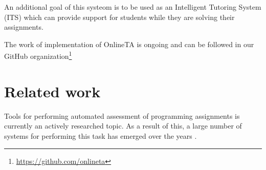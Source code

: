 An additional goal of this systeom is to be used as an Intelligent
Tutoring System (ITS)\cite{Freedman:2000:LIT:350752.350756} which can
provide support for students while they are solving their assignments.

The work of implementation of OnlineTA is ongoing and can be followed in our
GitHub organization\footnote{\url{https://github.com/onlineta}}



\section{Related work}
Tools for performing automated assessment of programming assignments
is currently an actively researched topic. As a result of this, a
large number of systems for performing this task has emerged over the
years \cite{Ihantola:2010:RRS:1930464.1930480}.





